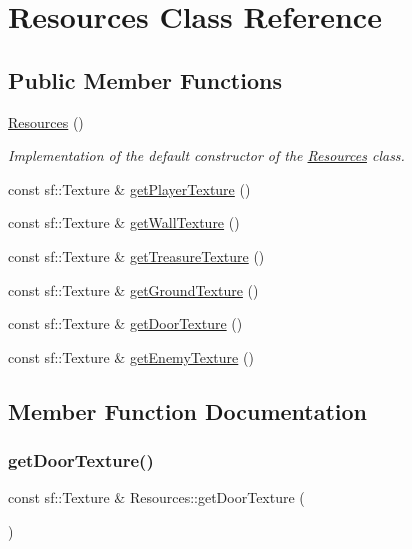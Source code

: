 \hypertarget{class_resources}{}\section{Resources Class Reference}
\label{class_resources}
\subsection*{Public Member Functions}
\begin{DoxyCompactItemize}
\item 
\hypertarget{class_resources_ab09435991b8c485f92e0aa1fd00828b9}{}\label{class_resources_ab09435991b8c485f92e0aa1fd00828b9} 
\hyperlink{class_resources_ab09435991b8c485f92e0aa1fd00828b9}{Resources} ()
\begin{DoxyCompactList}\small\item\em Implementation of the default constructor of the \hyperlink{class_resources}{Resources} class. \end{DoxyCompactList}\item 
const sf\+::\+Texture \& \hyperlink{class_resources_a168468ac127f26c5d687ec6eceedda4f}{get\+Player\+Texture} ()
\item 
const sf\+::\+Texture \& \hyperlink{class_resources_af823e01e9f30b8a2070c23ba5c572113}{get\+Wall\+Texture} ()
\item 
const sf\+::\+Texture \& \hyperlink{class_resources_a575fd499564e6d905d7e08dfba1349e6}{get\+Treasure\+Texture} ()
\item 
const sf\+::\+Texture \& \hyperlink{class_resources_ae75ffa794e1d7f355ad4e2d8f01901ec}{get\+Ground\+Texture} ()
\item 
const sf\+::\+Texture \& \hyperlink{class_resources_a3715f3cd927d0b809556ea677b40092e}{get\+Door\+Texture} ()
\item 
const sf\+::\+Texture \& \hyperlink{class_resources_ad9ea9a040070bedc00927f00bf09242f}{get\+Enemy\+Texture} ()
\end{DoxyCompactItemize}


\subsection{Member Function Documentation}
\hypertarget{class_resources_a3715f3cd927d0b809556ea677b40092e}{}\label{class_resources_a3715f3cd927d0b809556ea677b40092e} 
\subsubsection{\texorpdfstring{get\+Door\+Texture()}{getDoorTexture()}}
{\footnotesize\ttfamily const sf\+::\+Texture \& Resources\+::get\+Door\+Texture (\begin{DoxyParamCaption}{ }\end{DoxyParamCaption})}

